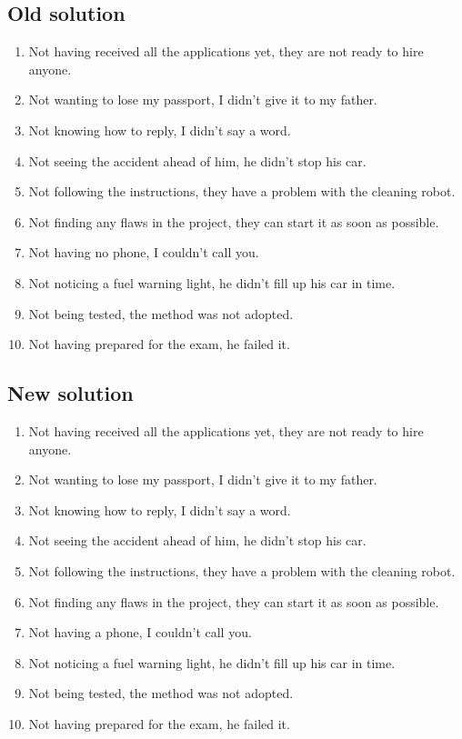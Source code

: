 \subsection*{Old solution}
\begin{enumerate}
      \item Not having received all the applications yet, they are not ready to hire anyone.
      \item Not wanting to lose my passport, I didn't give it to my father.
      \item Not knowing how to reply, I didn't say a word.
      \item Not seeing the accident ahead of him, he didn't stop his car.
      \item Not following the instructions, they have a problem with the cleaning robot.
      \item Not finding any flaws in the project, they can start it as soon as possible.
      \item Not having no phone, I couldn't call you.
      \item Not noticing a fuel warning light, he didn't fill up his car in time.
      \item Not being tested, the method was not adopted.
      \item Not having prepared for the exam, he failed it.
\end{enumerate}

\subsection*{New solution}
\begin{enumerate}
      \item Not having received all the applications yet, they are not ready to hire anyone.
      \item Not wanting to lose my passport, I didn't give it to my father.
      \item Not knowing how to reply, I didn't say a word.
      \item Not seeing the accident ahead of him, he didn't stop his car.
      \item Not following the instructions, they have a problem with the cleaning robot.
      \item Not finding any flaws in the project, they can start it as soon as possible.
      \item Not having a phone, I couldn't call you.
      \item Not noticing a fuel warning light, he didn't fill up his car in time.
      \item Not being tested, the method was not adopted.
      \item Not having prepared for the exam, he failed it.
\end{enumerate}

